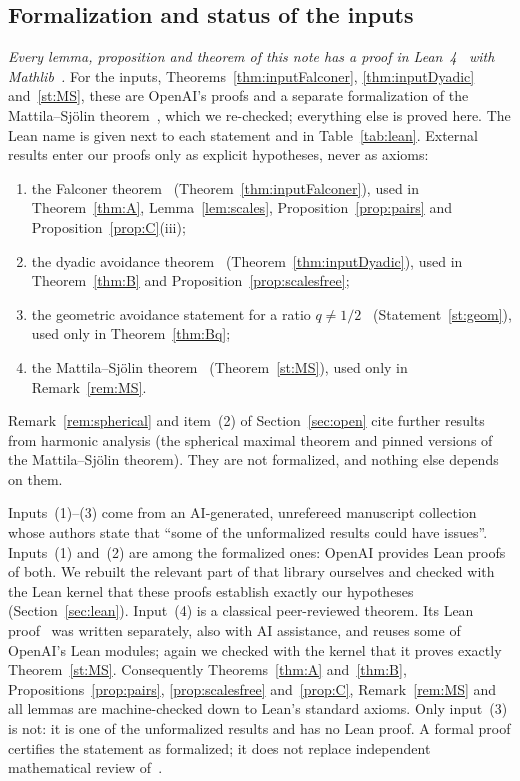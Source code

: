 \documentclass[11pt]{amsart}
\theoremstyle{definition}
\theoremstyle{remark}
\begin{document}
\subsection{Formalization and status of the inputs}\label{sec:status}
\emph{Every lemma, proposition and theorem of this note has a proof in Lean~4~\cite{Lean4} with
Mathlib~\cite{Mathlib2020}.} For the inputs, Theorems~\ref{thm:inputFalconer},
\ref{thm:inputDyadic} and~\ref{st:MS}, these are OpenAI's proofs and a separate formalization of the
Mattila--Sj\"olin theorem~\cite{SchillyMSLean}, which we re-checked; everything else is proved
here. The Lean name is given next to each statement and in Table~\ref{tab:lean}. External results
enter our proofs only as explicit hypotheses, never as axioms:
\begin{enumerate}[leftmargin=*]
\item the Falconer theorem~\cite{OAIFalconer} (Theorem~\ref{thm:inputFalconer}), used in
  Theorem~\ref{thm:A}, Lemma~\ref{lem:scales}, Proposition~\ref{prop:pairs} and
  Proposition~\ref{prop:C}(iii);
\item the dyadic avoidance theorem~\cite{OAIDyadic} (Theorem~\ref{thm:inputDyadic}), used in
  Theorem~\ref{thm:B} and Proposition~\ref{prop:scalesfree};
\item the geometric avoidance statement for a ratio $q\ne1/2$~\cite{OAIGeometric}
  (Statement~\ref{st:geom}), used only in Theorem~\ref{thm:Bq};
\item the Mattila--Sj\"olin theorem~\cite{MattilaSjolin1999} (Theorem~\ref{st:MS}), used only
  in Remark~\ref{rem:MS}.
\end{enumerate}
Remark~\ref{rem:spherical} and item~(2) of Section~\ref{sec:open} cite further results from
harmonic analysis (the spherical maximal theorem and pinned versions of the Mattila--Sj\"olin
theorem). They are not formalized, and nothing else depends on them.

Inputs~(1)--(3) come from an AI-generated, unrefereed manuscript collection whose authors state
that ``some of the unformalized results could have issues''. Inputs~(1) and~(2) are among the
formalized ones: OpenAI provides Lean proofs of both. We rebuilt the relevant part of that library
ourselves and checked with the Lean kernel that these proofs establish exactly our hypotheses
(Section~\ref{sec:lean}). Input~(4) is a classical peer-reviewed theorem. Its Lean
proof~\cite{SchillyMSLean} was written separately, also with AI assistance, and reuses some of
OpenAI's Lean modules; again we checked with the kernel that it proves exactly
Theorem~\ref{st:MS}. Consequently Theorems~\ref{thm:A} and~\ref{thm:B},
Propositions~\ref{prop:pairs}, \ref{prop:scalesfree} and~\ref{prop:C}, Remark~\ref{rem:MS} and all
lemmas are machine-checked down to Lean's standard axioms. Only input~(3) is not: it is one of the
unformalized results and has no Lean proof. A formal proof certifies the statement as formalized; it does not replace
independent mathematical review of~\cite{OAIFalconer,OAIDyadic}.
\end{document}
